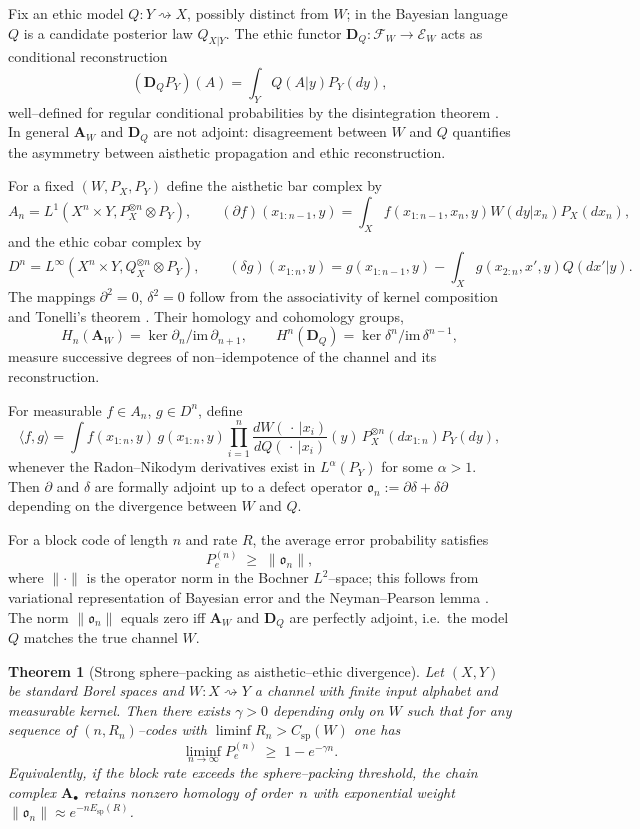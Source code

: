 \documentclass[12pt]{article}
\newcommand{\E}{\mathcal{E}}
\newcommand{\F}{\mathcal{F}}
\theoremstyle{plain}
\newtheorem{theorem}{Theorem}[section]
\theoremstyle{definition}
\theoremstyle{remark}
\numberwithin{equation}{section}
\begin{document}
Fix an ethic model $Q:Y\rightsquigarrow X$, possibly distinct from $W$; in the Bayesian language $Q$ is a candidate posterior law $Q_{X|Y}$.  
The ethic functor $\mathbf D_Q:\F_W\to\E_W$ acts as conditional reconstruction
\[
(\mathbf D_QP_Y)(A)=\int_Y Q(A|y)P_Y(dy),
\]
well--defined for regular conditional probabilities by the disintegration theorem \cite{Bogachev2007}.  
In general $\mathbf A_W$ and $\mathbf D_Q$ are not adjoint: disagreement between $W$ and $Q$ quantifies the asymmetry between aisthetic propagation and ethic reconstruction.
  
For a fixed $(W,P_X,P_Y)$ define the aisthetic bar complex by
\[
A_n=L^1(X^n\times Y,P_X^{\otimes n}\!\otimes P_Y),\qquad
(\partial f)(x_{1:n-1},y)=\int_X f(x_{1:n-1},x_n,y)W(dy|x_n)P_X(dx_n),
\]
and the ethic cobar complex by
\[
D^n=L^\infty(X^n\times Y,Q_X^{\otimes n}\!\otimes P_Y),\qquad
(\delta g)(x_{1:n},y)=g(x_{1:n-1},y)-\int_X g(x_{2:n},x',y)Q(dx'|y).
\]
The mappings $\partial^2=0$, $\delta^2=0$ follow from the associativity of kernel composition and Tonelli's theorem \cite{Kallenberg2002}.  
Their homology and cohomology groups,
\[
H_n(\mathbf A_W)=\ker\partial_n/\mathrm{im}\,\partial_{n+1},\qquad
H^n(\mathbf D_Q)=\ker\delta^n/\mathrm{im}\,\delta^{n-1},
\]
measure successive degrees of non--idempotence of the channel and its reconstruction.  
 
For measurable $f\in A_n$, $g\in D^n$, define
\[
\langle f,g\rangle
=\int f(x_{1:n},y)\,g(x_{1:n},y)
\prod_{i=1}^n
\frac{dW(\,\cdot\,|x_i)}{dQ(\,\cdot\,|x_i)}(y)\,P_X^{\otimes n}(dx_{1:n})P_Y(dy),
\]
whenever the Radon--Nikodym derivatives exist in $L^\alpha(P_Y)$ for some $\alpha>1$.  
Then $\partial$ and $\delta$ are formally adjoint up to a defect operator 
$\mathfrak o_n:=\partial\delta+\delta\partial$ depending on the divergence between $W$ and $Q$.

For a block code of length $n$ and rate $R$, the average error probability satisfies
\[
P_e^{(n)}\;\ge\;\|\mathfrak o_n\|,
\]
where $\|\cdot\|$ is the operator norm in the Bochner $L^2$--space; this follows from variational representation of Bayesian error and the Neyman–Pearson lemma \cite{PolyanskiyPoorVerdu2010}.  
The norm $\|\mathfrak o_n\|$ equals zero iff $\mathbf A_W$ and $\mathbf D_Q$ are perfectly adjoint, i.e.\ the model $Q$ matches the true channel $W$.

\begin{theorem}[Strong sphere--packing as aisthetic--ethic divergence]\label{thm:spherepacking}
Let $(X,Y)$ be standard Borel spaces and $W:X\rightsquigarrow Y$ a channel with finite input alphabet and measurable kernel.  
Then there exists $\gamma>0$ depending only on $W$ such that for any sequence of $(n,R_n)$--codes with $\liminf R_n>C_{\mathrm{sp}}(W)$ one has
\[
\liminf_{n\to\infty} P_e^{(n)}\;\ge\;1-e^{-\gamma n}.
\]
Equivalently, if the block rate exceeds the sphere--packing threshold, the chain complex $\mathbf A_\bullet$ retains nonzero homology of order~$n$ with exponential weight $\|\mathfrak o_n\|\approx e^{-nE_{\mathrm{sp}}(R)}$.
\end{theorem}
\end{document}
